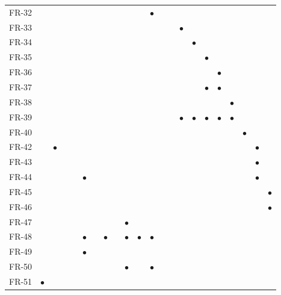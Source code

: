 \documentclass[11pt,a4paper]{article}
\begin{document}
\begin{longtable}{@{}l*{21}{c}@{}}
FR-32&&&&&&&&&&&\cellcolor{hdr}\textcolor{creBlue}{$\bullet$}&&&&&&&&&&\\
FR-33&&&&&&&&&&&&&&\cellcolor{hdr}\textcolor{creBlue}{$\bullet$}&&&&&&&\\
FR-34&&&&&&&&&&&&&&&\cellcolor{hdr}\textcolor{creBlue}{$\bullet$}&&&&&&\\
FR-35&&&&&&&&&&&&&&&&\cellcolor{hdr}\textcolor{creBlue}{$\bullet$}&&&&&\\
FR-36&&&&&&&&&&&&&&&&&\cellcolor{hdr}\textcolor{creBlue}{$\bullet$}&&&&\\
FR-37&&&&&&&&&&&&&&&&\cellcolor{hdr}\textcolor{creBlue}{$\bullet$}&\cellcolor{hdr}\textcolor{creBlue}{$\bullet$}&&&&\\
FR-38&&&&&&&&&&&&&&&&&&\cellcolor{hdr}\textcolor{creBlue}{$\bullet$}&&&\\
FR-39&&&&&&&&&&&&&&\cellcolor{hdr}\textcolor{creBlue}{$\bullet$}&\cellcolor{hdr}\textcolor{creBlue}{$\bullet$}&\cellcolor{hdr}\textcolor{creBlue}{$\bullet$}&\cellcolor{hdr}\textcolor{creBlue}{$\bullet$}&\cellcolor{hdr}\textcolor{creBlue}{$\bullet$}&&&\\
FR-40&&&&&&&&&&&&&&&&&&&\cellcolor{hdr}\textcolor{creBlue}{$\bullet$}&&\\
FR-42&&\cellcolor{hdr}\textcolor{creBlue}{$\bullet$}&&&&&&&&&&&&&&&&&&\cellcolor{hdr}\textcolor{creBlue}{$\bullet$}&\\
FR-43&&&&&&&&&&&&&&&&&&&&\cellcolor{hdr}\textcolor{creBlue}{$\bullet$}&\\
FR-44&&&&&\cellcolor{hdr}\textcolor{creBlue}{$\bullet$}&&&&&&&&&&&&&&&\cellcolor{hdr}\textcolor{creBlue}{$\bullet$}&\\
FR-45&&&&&&&&&&&&&&&&&&&&&\cellcolor{hdr}\textcolor{creBlue}{$\bullet$}\\
FR-46&&&&&&&&&&&&&&&&&&&&&\cellcolor{hdr}\textcolor{creBlue}{$\bullet$}\\
FR-47&&&&&&&&&\cellcolor{hdr}\textcolor{creBlue}{$\bullet$}&&&&&&&&&&&&\\
FR-48&&&&&\cellcolor{hdr}\textcolor{creBlue}{$\bullet$}&&\cellcolor{hdr}\textcolor{creBlue}{$\bullet$}&&\cellcolor{hdr}\textcolor{creBlue}{$\bullet$}&\cellcolor{hdr}\textcolor{creBlue}{$\bullet$}&\cellcolor{hdr}\textcolor{creBlue}{$\bullet$}&&&&&&&&&&\\
FR-49&&&&&\cellcolor{hdr}\textcolor{creBlue}{$\bullet$}&&&&&&&&&&&&&&&&\\
FR-50&&&&&&&&&\cellcolor{hdr}\textcolor{creBlue}{$\bullet$}&&\cellcolor{hdr}\textcolor{creBlue}{$\bullet$}&&&&&&&&&&\\
FR-51&\cellcolor{hdr}\textcolor{creBlue}{$\bullet$}&&&&&&&&&&&&&&&&&&&&\\

\end{longtable}
\end{document}
